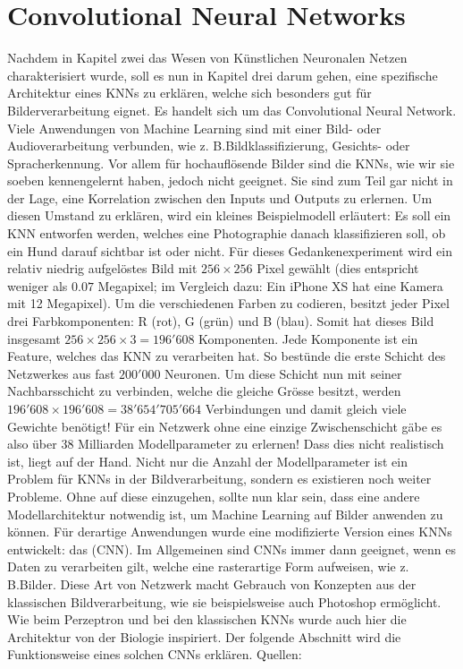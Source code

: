 \chapter{Convolutional Neural Networks}\label{sec:CNN}
Nachdem in Kapitel zwei das Wesen von Künstlichen Neuronalen Netzen
charakterisiert wurde, soll es nun in Kapitel drei darum gehen, eine spezifische
Architektur eines KNNs zu erklären, welche sich besonders gut für Bilderverarbeitung eignet.
Es handelt sich um das Convolutional Neural Network.
\para{}
\bigskip
Viele Anwendungen von Machine Learning sind mit einer Bild- oder
Audioverarbeitung verbunden, wie z. B.Bildklassifizierung, Gesichts- oder
Spracherkennung.
Vor allem für hochauflösende Bilder sind die KNNs, wie wir sie soeben
kennengelernt haben, jedoch nicht geeignet. Sie sind zum Teil gar nicht in der
Lage, eine Korrelation zwischen den Inputs und Outputs zu erlernen.
Um diesen Umstand zu erklären, wird ein kleines Beispielmodell erläutert:
\para{}
\label{sec:CNN_parameter_problem}
Es soll ein KNN entworfen werden, welches eine Photographie danach klassifizieren
soll, ob ein Hund darauf sichtbar ist oder nicht. Für dieses
Gedankenexperiment wird ein relativ niedrig aufgelöstes Bild mit $256 \times 256$
Pixel gewählt (dies entspricht weniger als $0.07$ Megapixel; im Vergleich dazu:
Ein iPhone XS hat eine Kamera mit 12 Megapixel). Um die verschiedenen Farben zu codieren, besitzt jeder Pixel drei
Farbkomponenten: R (rot), G (grün)
und B (blau). Somit hat dieses Bild insgesamt $256 \times 256 \times 3 = 196'608$
Komponenten. Jede Komponente ist ein Feature, welches das KNN zu verarbeiten hat. So bestünde
die erste Schicht des Netzwerkes aus fast $200'000$ Neuronen. Um diese Schicht
nun mit seiner Nachbarsschicht zu verbinden, welche die gleiche Grösse besitzt, werden
$196'608 \times 196'608 = 38'654'705'664$ Verbindungen und damit gleich
viele Gewichte benötigt! Für ein Netzwerk ohne eine einzige Zwischenschicht gäbe es
also über 38 Milliarden Modellparameter zu erlernen! Dass dies nicht realistisch ist,
liegt auf der Hand.
\para{}
Nicht nur die Anzahl der Modellparameter ist ein Problem für KNNs in der
Bildverarbeitung, sondern es existieren noch weiter Probleme.
Ohne auf diese einzugehen, sollte nun klar sein, dass eine andere Modellarchitektur notwendig ist, um Machine
Learning auf Bilder anwenden zu können. Für derartige Anwendungen wurde eine modifizierte
Version eines KNNs entwickelt: das  (CNN).
Im Allgemeinen sind CNNs immer dann geeignet, wenn es Daten zu verarbeiten gilt, welche eine
rasterartige Form aufweisen, wie z. B.Bilder.
Diese Art von Netzwerk macht Gebrauch von Konzepten aus der klassischen
Bildverarbeitung, wie sie beispielsweise auch Photoshop ermöglicht.
Wie beim Perzeptron und bei den klassischen KNNs wurde auch hier die Architektur
von der Biologie inspiriert.
Der folgende Abschnitt wird die Funktionsweise eines solchen CNNs erklären.
\para{}
Quellen: \cite{Goodfellow-et-al-2016} \cite{deeplearning.ai:cnn} \cite{wiki:cnn}


